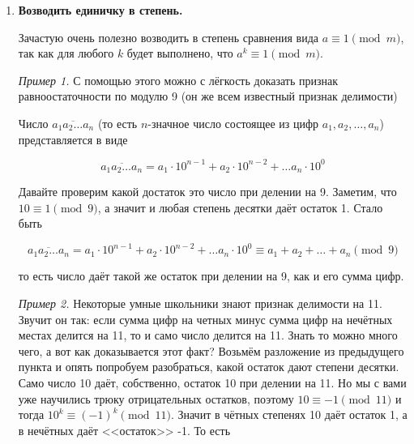 \begin{enumerate}
    \textbf{Решение.}
    Заменим каждое число на его отрицательный остаток по модулю $1004$.


    $$
    1000 \equiv -1 \pmod{1004} \quad 1001 \equiv -2 \pmod{1004}
    $$

    $$
    1002 \equiv -3 \pmod{1004} \quad 1003 \equiv -4 \pmod{1004}
    $$

    Опять перемножим все сравнения и получим требуемое.
    
    \textit{Пример 2.} Докажите, что число $5^{70}+6^{70}$ делится на 61 .

    \textbf{Решение.}
    Заметим, что $5^2 = 25 \equiv -36 \equiv -6^2 \pmod{61}$

    Тогда по свойствам степеней и сравнений по модулю получаем, что

    $$
    5^{70} = (5^2)^{35} \equiv (-6^2)^{35} = -6^{70} \pmod{61} 
    $$

    а значит исходное выражение даёт остаток 0 при делении на $61$.

    \item \textbf{Возводить единичку в степень.}

    Зачастую очень полезно возводить в степень сравнения вида $a \equiv 1 \pmod{m}$, так как для любого $k$ будет выполнено, что $a^k \equiv 1 \pmod{m}$. 

    \textit{Пример 1.} С помощью этого можно с лёгкость доказать признак равноостаточности по модулю 9 (он же всем известный признак делимости)

    Число $\overline{a_1a_2\ldots a_n}$ (то есть $n$-значное число состоящее из цифр $a_1,a_2, \ldots, a_n$) представляется в виде

    $$
    \overline{a_1a_2\ldots a_n} = a_1\cdot 10^{n-1} + a_2 \cdot 10^{n-2} + \ldots a_n \cdot10^0
    $$

    Давайте проверим какой достаток это число при делении на 9. Заметим, что $10\equiv1 \pmod{9}$, а значит и любая степень десятки даёт остаток 1. Стало быть 

    $$
    \overline{a_1a_2\ldots a_n} = a_1\cdot 10^{n-1} + a_2 \cdot 10^{n-2} + \ldots a_n \cdot10^0 \equiv a_1 + a_2 +\ldots + a_n \pmod{9}
    $$

    то есть число даёт такой же остаток при делении на 9, как и его сумма цифр. 

    \newpage

    \hspace{3mm}

    \textit{Пример 2.}
    Некоторые умные школьники знают признак делимости на 11. Звучит он так: если сумма цифр на четных минус сумма цифр на нечётных местах делится на 11, то и само число делится на 11. Знать то можно много чего, а вот как доказывается этот факт? Возьмём разложение из предыдущего пункта и опять попробуем разобраться, какой остаток дают степени десятки. Само число 10 даёт, собственно, остаток 10 при делении на 11. Но мы с вами уже научились трюку отрицательных остатков, поэтому $10 \equiv -1 \pmod{11}$ и тогда $10^k \equiv (-1)^k \pmod{11}$. Значит в чётных степенях 10 даёт остаток 1, а в нечётных даёт <<остаток>> -1. То есть 


\end{enumerate}
